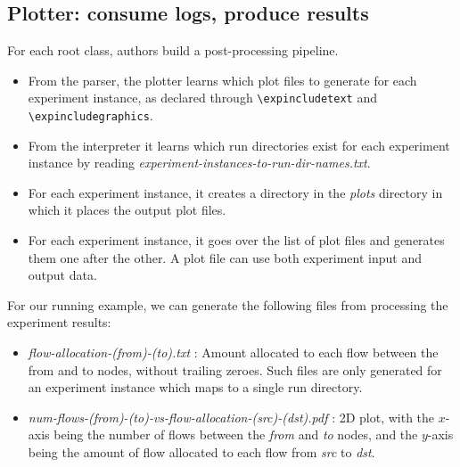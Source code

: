 
\subsection{Plotter: consume logs, produce results}
\label{sec:plotter}

For each root class, authors build a post-processing pipeline. 

\begin{itemize}[leftmargin=12pt,itemsep=2pt,topsep=2pt]
    \item From the parser, the plotter learns which plot files to generate for each experiment instance, as declared through \texttt{\textbackslash expincludetext} and \texttt{\textbackslash expincludegraphics}.
    
    \item From the interpreter it learns which run directories exist for each experiment instance by reading \textit{experiment-instances-to-run-dir-names.txt}.
    
    \item For each experiment instance, it creates a directory in the \textit{plots} directory in which it places the output plot files.
    
    \item For each experiment instance, it goes over the list of plot files and generates them one after the other. A plot file can use both experiment input and output data.
    
\end{itemize}

\noindent For our running example, we can generate the following files from processing the experiment results:

\begin{itemize}[leftmargin=12pt,itemsep=2pt,topsep=2pt]
    \item \textit{flow-allocation-(from)-(to).txt} : Amount allocated to each flow between the from and to nodes, without trailing zeroes. Such files are only generated for an experiment instance which maps to a single run directory.
    \item \textit{num-flows-(from)-(to)-vs-flow-allocation-(src)-(dst).pdf} : 2D plot, with the $x$-axis being the number of flows between the \textit{from} and \textit{to} nodes, and the $y$-axis being the amount of flow allocated to each flow from \textit{src} to \textit{dst}.
\end{itemize}

